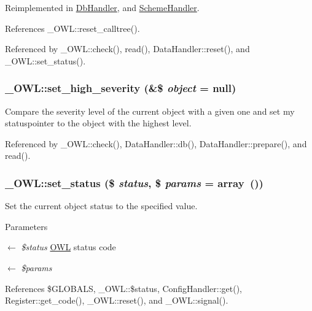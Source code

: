 Reimplemented in \hyperlink{classDbHandler_a9982df4830f05803935bb31bac7fae3d}{DbHandler}, and \hyperlink{classSchemeHandler_aa25feb4a70d67b3d571904be4b2f50bc}{SchemeHandler}.



References \_\-OWL::reset\_\-calltree().



Referenced by \_\-OWL::check(), read(), DataHandler::reset(), and \_\-OWL::set\_\-status().

\subsubsection[{set\_\-high\_\-severity}]{\setlength{\rightskip}{0pt plus 5cm}\_\-OWL::set\_\-high\_\-severity (\&\$ {\em object} = {\ttfamily null})}\label{class__OWL_a576829692a3b66e3d518853bf43abae3}
Compare the severity level of the current object with a given one and set my statuspointer to the object with the highest level. 

Referenced by \_\-OWL::check(), DataHandler::db(), DataHandler::prepare(), and read().

\subsubsection[{set\_\-status}]{\setlength{\rightskip}{0pt plus 5cm}\_\-OWL::set\_\-status (\$ {\em status}, \/  \$ {\em params} = {\ttfamily array~()})}\label{class__OWL_aea912d0ede9b3c2a69b79072d94d4787}
Set the current object status to the specified value.


\begin{DoxyParams}{Parameters}
\item[\mbox{$\leftarrow$} {\em \$status}]\hyperlink{classOWL}{OWL} status code \item[\mbox{$\leftarrow$} {\em \$params}]\end{DoxyParams}


References \$GLOBALS, \_\-OWL::\$status, ConfigHandler::get(), Register::get\_\-code(), \_\-OWL::reset(), and \_\-OWL::signal().



